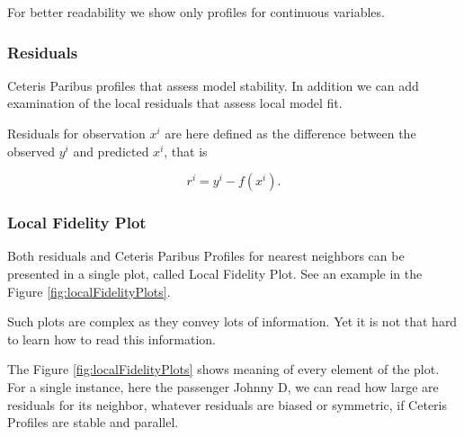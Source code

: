 \documentclass[12pt,]{krantz}
\theoremstyle{definition}
\theoremstyle{definition}
\theoremstyle{definition}
\theoremstyle{remark}
\begin{document}
For better readability we show only profiles for continuous variables.

\hypertarget{residuals}{%
\subsubsection{Residuals}\label{residuals}}

Ceteris Paribus profiles that assess model stability. In addition we can
add examination of the local residuals that assess local model fit.

Residuals for observation \(x^i\) are here defined as the difference
between the observed \(y^i\) and predicted \(x^i\), that is

\[
r^i = y^i - f(x^i).
\]

\hypertarget{local-fidelity-plot}{%
\subsubsection{Local Fidelity Plot}\label{local-fidelity-plot}}

Both residuals and Ceteris Paribus Profiles for nearest neighbors can be
presented in a single plot, called Local Fidelity Plot. See an example
in the Figure \ref{fig:localFidelityPlots}.

Such plots are complex as they convey lots of information. Yet it is not
that hard to learn how to read this information.

The Figure \ref{fig:localFidelityPlots} shows meaning of every element
of the plot. For a single instance, here the passenger Johnny D, we can
read how large are residuals for its neighbor, whatever residuals are
biased or symmetric, if Ceteris Profiles are stable and parallel.
\end{document}
